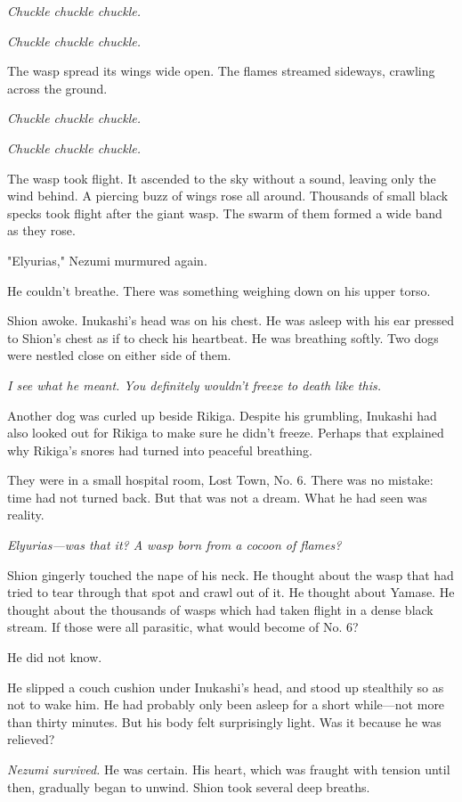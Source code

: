 \emph{Chuckle chuckle chuckle.}

\emph{Chuckle chuckle chuckle.}

The wasp spread its wings wide open. The flames streamed sideways,
crawling across the ground.

\emph{Chuckle chuckle chuckle.}

\emph{Chuckle chuckle chuckle.}

The wasp took flight. It ascended to the sky without a sound, leaving
only the wind behind. A piercing buzz of wings rose all around.
Thousands of small black specks took flight after the giant wasp. The
swarm of them formed a wide band as they rose.

"Elyurias," Nezumi murmured again.

\myspace

He couldn't breathe. There was something weighing down on his upper
torso.

Shion awoke. Inukashi's head was on his chest. He was asleep with his
ear pressed to Shion's chest as if to check his heartbeat. He was
breathing softly. Two dogs were nestled close on either side of them.

\emph{I see what he meant. You definitely wouldn't freeze to death like this.}

Another dog was curled up beside Rikiga. Despite his grumbling, Inukashi
had also looked out for Rikiga to make sure he didn't freeze. Perhaps
that explained why Rikiga's snores had turned into peaceful breathing.

They were in a small hospital room, Lost Town, No. 6. There was no
mistake: time had not turned back. But that was not a dream. What he had
seen was reality.

\emph{Elyurias---was that it? A wasp born from a cocoon of flames?}

Shion gingerly touched the nape of his neck. He thought about the wasp
that had tried to tear through that spot and crawl out of it. He thought
about Yamase. He thought about the thousands of wasps which had taken
flight in a dense black stream. If those were all parasitic, what would
become of No. 6?

He did not know.

He slipped a couch cushion under Inukashi's head, and stood up
stealthily so as not to wake him. He had probably only been asleep for a
short while---not more than thirty minutes. But his body felt surprisingly
light. Was it because he was relieved?

\emph{Nezumi survived.} He was certain. His heart, which was fraught with
tension until then, gradually began to unwind. Shion took several deep
breaths.

